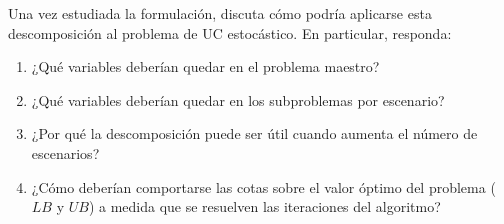 \documentclass[
	spanish, %
	letterpaper, oneside
]{article}
\begin{document}
Una vez estudiada la formulación, discuta cómo podría aplicarse esta descomposición al problema de UC estocástico. En particular, responda:

\begin{enumerate}
\item ¿Qué variables deberían quedar en el problema maestro?
\item ¿Qué variables deberían quedar en los subproblemas por escenario?
\item ¿Por qué la descomposición puede ser útil cuando aumenta el número de escenarios?
\item ¿Cómo deberían comportarse las cotas sobre el valor óptimo del problema ($LB$ y $UB$) a medida que se resuelven las iteraciones del algoritmo?
\end{enumerate}




\end{document}
